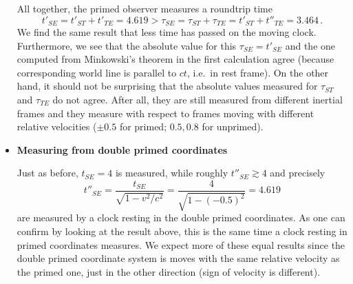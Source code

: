 \begin{ex}
\begin{itemize}
	All together, the primed observer measures a roundtrip time
	\begin{equation*}
	t'_{SE} = t'_{ST} + t'_{TE} = 4.619 > \tau_{SE} = \tau_{ST} + \tau_{TE} = t'_{ST} + t''_{TE} = 3.464 \, .
	\end{equation*}
	We find the same result that less time has passed on the moving clock. Furthermore, we see that the absolute value for this $\tau_{SE} = t'_{SE}$ and the one computed from Minkowski's theorem in the first calculation agree (because corresponding world line is parallel to $ct$, i.e.~in rest frame). On the other hand, it should not be surprising that the absolute values measured for $\tau_{ST}$ and $\tau_{TE}$ do not agree. After all, they are still measured from different inertial frames and they measure with respect to frames moving with different relative velocities ($\pm 0.5$ for primed; $0.5, 0.8$ for unprimed).

	
	
	
	\item \textbf{Measuring from double primed coordinates}

	Just as before, $t_{SE} = 4$ is measured, while roughly $t''_{SE} \gtrsim 4$ and precisely
	\begin{equation*}
	t''_{SE} = \frac{t_{SE}}{\sqrt{1 - v^2 / c^2}} = \frac{4}{\sqrt{1 - (-0.5)^2}} = 4.619
	\end{equation*}
	are measured by a clock resting in the double primed coordinates. As one can confirm by looking at the result above, this is the same time a clock resting in primed coordinates measures. We expect more of these equal results since the double primed coordinate system is moves with the same relative velocity as the primed one, just in the other direction (sign of velocity is different).


\end{itemize}
\end{ex}

